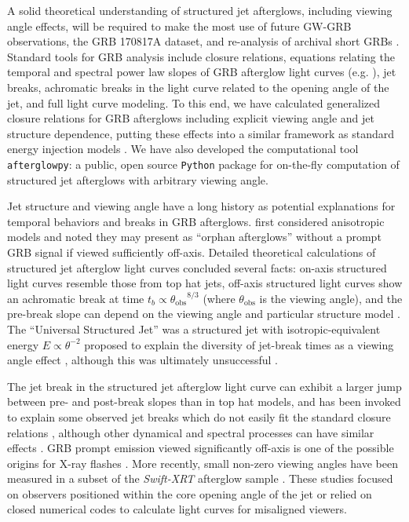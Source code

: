 \documentclass[twocolumn]{aastex62}
\newcommand{\grbbns}{GRB 170817A}
\newcommand{\afterglowpy}{{\tt afterglowpy}}
\newcommand{\python}{{\tt Python}}
\newcommand{\swiftXRT}{{\em Swift-XRT}}
\newcommand{\thobs}{\ensuremath{\theta_{\mathrm{obs}}}}
\begin{document}
A solid theoretical understanding of structured jet afterglows, including viewing angle effects, will be required to make the most use of future GW-GRB observations, the \grbbns{} dataset, and re-analysis of archival short GRBs \citep{Troja:2018ab, Troja:2019aa}. Standard tools for GRB analysis include closure relations, equations relating the temporal and spectral power law slopes of GRB afterglow light curves (e.g. \citet{Granot:2002aa, Racusin:2009aa}), jet breaks, achromatic breaks in the light curve related to the opening angle of the jet, and full light curve modeling.  To this end, we have calculated generalized closure relations for GRB afterglows including explicit viewing angle and jet structure dependence, putting these effects into a similar framework as standard energy injection models \citep{Zhang:2006aa}.
 We have also developed the computational tool \afterglowpy{}: a public, open source \python{} package for on-the-fly computation of structured jet afterglows with arbitrary viewing angle.

Jet structure and viewing angle have a long history as potential explanations for temporal behaviors and breaks in GRB afterglows.  \citet{Meszaros:1998aa} first considered anisotropic models and noted they may present as ``orphan afterglows'' without a prompt GRB signal if viewed sufficiently off-axis.  Detailed theoretical calculations of structured jet afterglow light curves concluded several facts: on-axis structured light curves resemble those from top hat jets, off-axis structured light curves show an achromatic break at time $t_b\propto \thobs^{8/3}$ (where $\thobs$ is the viewing angle), and the pre-break slope can depend on the viewing angle and particular structure model \citep{Rossi:2002aa, Dalal:2002aa, Granot:2002aa, Panaitescu:2003aa, Kumar:2003aa, Granot:2003aa, Salmonson:2003aa, Rossi:2004aa}. The ``Universal Structured Jet'' was a structured jet with isotropic-equivalent energy $E \propto \theta^{-2}$ proposed to explain the diversity of jet-break times as a viewing angle effect  \citep{Lipunov:2001aa, Zhang:2002aa}, although this was ultimately unsuccessful \citep{Nakar:2004aa}. 

The jet break in the structured jet afterglow light curve can exhibit a larger jump between pre- and post-break slopes than in top hat models, and has been invoked to explain some observed jet breaks which do not easily fit the standard closure relations \citep{Panaitescu:2005aa, Panaitescu:2005ab}, although other dynamical and spectral processes can have similar effects \citep{Piro:2005aa, Corsi:2006aa}.  GRB prompt emission viewed significantly off-axis is one of the possible origins for X-ray flashes \citep{Ioka:2001aa, Yamazaki:2002aa, Yamazaki:2003aa, Peng:2005aa, DAlessio:2006aa}.  More recently, small non-zero viewing angles have been measured in a subset of the \swiftXRT{} afterglow sample \citep{Ryan:2015aa, Zhang:2015aa, Troja:2016aa}.  These studies focused on observers positioned within the core opening angle of the jet or relied on closed numerical codes to calculate light curves for misaligned viewers.  
\end{document}
